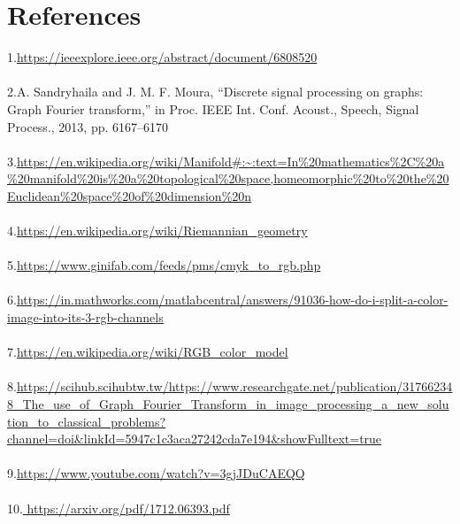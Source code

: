 \documentclass[12pt,onecolumn]{article}
\begin{document}
\section{\textbf{References}}
1.\url{https://ieeexplore.ieee.org/abstract/document/6808520}\\ \\
2.A. Sandryhaila and J. M. F. Moura, “Discrete signal processing on graphs: Graph Fourier transform,” in Proc. IEEE Int. Conf. Acoust., Speech, Signal Process., 2013, pp. 6167–6170 \\ \\
3.\url{https://en.wikipedia.org/wiki/Manifold#:~:text=In%20mathematics%2C%20a%20manifold%20is%20a%20topological%20space,homeomorphic%20to%20the%20Euclidean%20space%20of%20dimension%20n} \\ \\
4.\url{https://en.wikipedia.org/wiki/Riemannian_geometry}\\ \\
5.\url{https://www.ginifab.com/feeds/pms/cmyk_to_rgb.php}\\ \\
6.\url{https://in.mathworks.com/matlabcentral/answers/91036-how-do-i-split-a-color-image-into-its-3-rgb-channels}\\ \\
7.\url{https://en.wikipedia.org/wiki/RGB_color_model}\\ \\
8.\url{https://scihub.scihubtw.tw/https://www.researchgate.net/publication/317662348_The_use_of_Graph_Fourier_Transform_in_image_processing_a_new_solution_to_classical_problems?channel=doi&linkId=5947c1c3aca27242cda7e194&showFulltext=true} \\ \\
9.\url{https://www.youtube.com/watch?v=3gjJDuCAEQQ} \\ \\
10.\url{ https://arxiv.org/pdf/1712.06393.pdf} 
\end{document}
